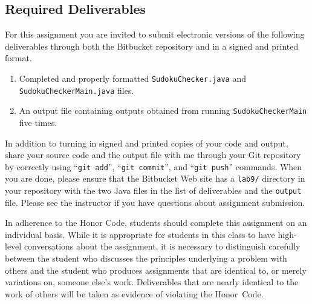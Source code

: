 \vspace{-0.1in}
\subsection*{Required Deliverables}
\vspace{-0.05in}

For this assignment you are invited to submit electronic versions of the following deliverables through both the Bitbucket
repository and in a signed and printed format.

\vspace{-0.05in}
\begin{enumerate}
    \setlength{\itemsep}{0pt}
  \item Completed and properly formatted {\tt SudokuChecker.java} and {\tt SudokuCheckerMain.java} files.

  \item An output file containing outputs obtained from running {\tt SudokuCheckerMain} five times.
        
\end{enumerate}
\vspace{-0.05in}

In addition to turning in signed and printed copies of your code and output, share your source code and the output
file with me through your Git repository by correctly using ``{\tt git add}'', ``{\tt git commit}'', and ``{\tt git
  push}'' commands. When you are done, please ensure that the Bitbucket Web site has a {\tt lab9/} directory in your
repository with the two Java files in the list of deliverables and the {\tt output} file. Please see the instructor
if you have questions about assignment submission.


In adherence to the Honor Code, students should complete this assignment on an individual basis. While it is appropriate
for students in this class to have high-level conversations about the assignment, it is necessary to distinguish
carefully between the student who discusses the principles underlying a problem with others and the student who produces
assignments that are identical to, or merely variations on, someone else's work.  Deliverables that are nearly identical
to the work of others will be taken as evidence of violating the \mbox{Honor Code}.  



